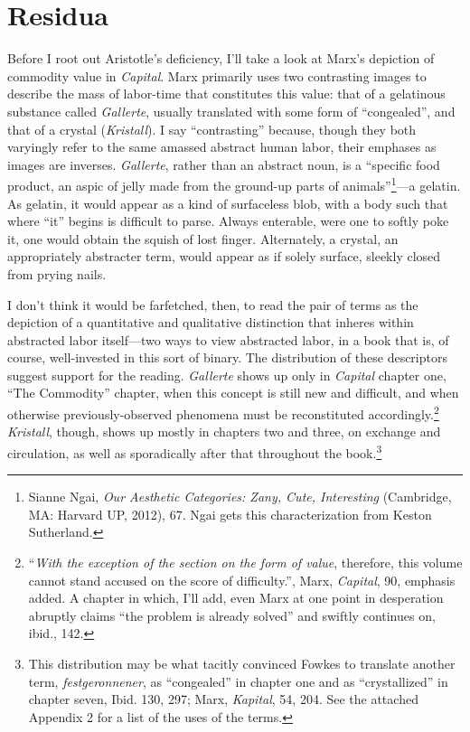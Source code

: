 \documentclass[12pt]{article}
\begin{document}
\section{Residua}
Before I root out Aristotle's deficiency, I'll take a look at Marx's depiction of commodity value in \textit{Capital}. Marx primarily uses two contrasting images to describe the mass of labor-time that constitutes this value: that of a gelatinous substance called \textit{Gallerte}, usually translated with some form of ``congealed'', and that of a crystal (\textit{Kristall}). I say ``contrasting'' because, though they both varyingly refer to the same amassed abstract human labor, their emphases as images are inverses. \textit{Gallerte}, rather than an abstract noun, is a ``specific food product, an aspic of jelly made from the ground-up parts of animals''\footnote{Sianne Ngai, \textit{Our Aesthetic Categories: Zany, Cute, Interesting} (Cambridge, MA: Harvard UP, 2012), 67. Ngai gets this characterization from Keston Sutherland.}---a gelatin. As gelatin, it would appear as a kind of surfaceless blob, with a body such that where ``it'' begins is difficult to parse. Always enterable, were one to softly poke it, one would obtain the squish of lost finger. Alternately, a crystal, an appropriately abstracter term, would appear as if solely surface, sleekly closed from prying nails.  

I don't think it would be farfetched, then, to read the pair of terms as the depiction of a quantitative and qualitative distinction that inheres within abstracted labor itself---two ways to view abstracted labor, in a book that is, of course, well-invested in this sort of binary. The distribution of these descriptors suggest support for the reading. \textit{Gallerte} shows up only in \textit{Capital} chapter one, ``The Commodity'' chapter, when this concept is still new and difficult, and when otherwise previously-observed phenomena must be reconstituted accordingly.\footnote{``\textit{With the exception of the section on the form of value}, therefore, this volume cannot stand accused on the score of difficulty.'', Marx, \textit{Capital}, 90, emphasis added. A chapter in which, I'll add, even Marx at one point in desperation abruptly claims ``the problem is already solved'' and swiftly continues on, ibid., 142.} \textit{Kristall}, though, shows up mostly in chapters two and three, on exchange and circulation, as well as sporadically after that throughout the book.\footnote{This distribution may be what tacitly convinced Fowkes to translate another term, \textit{festgeronnener}, as ``congealed'' in chapter one and as ``crystallized'' in chapter seven, Ibid. 130, 297; Marx, \textit{Kapital}, 54, 204. See the attached Appendix 2 for a list of the uses of the terms.}   
\end{document}
